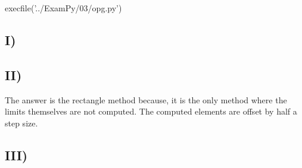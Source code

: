 \documentclass[../main.tex]{subfiles}
\begin{document}
\begin{pycode}[03e]
execfile('../ExamPy/03/opg.py')
\end{pycode}

\subsection*{I)}%
\label{sub:i_}

\begin{center}
\end{center}

\subsection*{II)}%
\label{sub:ii_}


The answer is the rectangle method because, it is the only method where the limits themselves
are not computed. The computed elements are offset by half a step size.

\subsection*{III)}%
\label{sub:iii_}

\begin{center}
\end{center}
\inputminted{python}{../ExamPy/03/opg.py}

	
\end{document}
